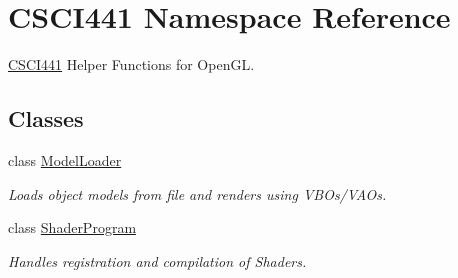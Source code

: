 \hypertarget{namespace_c_s_c_i441}{}\section{C\+S\+C\+I441 Namespace Reference}
\label{namespace_c_s_c_i441}


\hyperlink{namespace_c_s_c_i441}{C\+S\+C\+I441} Helper Functions for Open\+GL.  


\subsection*{Classes}
\begin{DoxyCompactItemize}
\item 
class \hyperlink{class_c_s_c_i441_1_1_model_loader}{Model\+Loader}
\begin{DoxyCompactList}\small\item\em Loads object models from file and renders using V\+B\+Os/\+V\+A\+Os. \end{DoxyCompactList}\item 
class \hyperlink{class_c_s_c_i441_1_1_shader_program}{Shader\+Program}
\begin{DoxyCompactList}\small\item\em Handles registration and compilation of Shaders. \end{DoxyCompactList}\end{DoxyCompactItemize}
